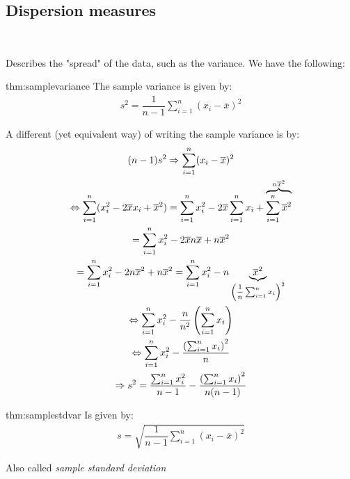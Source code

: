 \subsection{Dispersion measures}\hfill\\\par
\noindent Describes the "spread" of the data, such as the variance. We have the following:
\par\bigskip
\begin{theo}{thm:samplevariance}
  The sample variance is given by:
  \begin{equation*}
    \begin{gathered}
      s^2 = \dfrac{1}{n-1}\sum_{i=1}^{n}(x_i-\overline{x})^2
    \end{gathered}
  \end{equation*}
\end{theo}
\newpage
\noindent A different (yet equivalent way) of writing the sample variance is by:
\begin{equation*}
  \begin{gathered}
    (n-1)s^2\Rightarrow \sum_{i=1}^{n}(x_i-\overline{x})^2\\
    \Leftrightarrow \sum_{i=1}^{n}(x_i^2-2\overline{x}x_i+\overline{x}^2) = \sum_{i=1}^{n}x_i^2-2\overline{x}\sum_{i=1}^{n}x_i+\overbrace{\sum_{i=1}^{n}\overline{x}^2}^{\text{$n\overline{x}^2$}}\\
    =\sum_{i=1}^{n}x_i^2-2\overline{x}n\overline{x}+n\overline{x}^2\\
  =\sum_{i=1}^{n}x_i^2 -2n\overline{x}^2+n\overline{x}^2 = \sum_{i=1}^{n}x_i^2-n\underbrace{\overline{x}^2}_{\text{$\left(\dfrac{1}{n}\sum_{i=1}^{n}x_i\right)^2$}}\\
  \Leftrightarrow \sum_{i=1}^{n}x_i^2-\dfrac{n}{n^2}\left(\sum_{i=1}^{n}x_i\right)\\
  \Leftrightarrow \sum_{i=1}^{n}x_i^2-\dfrac{\left(\sum_{i=1}^{n}x_i\right)^2}{n}\\
  \Rightarrow s^2 = \dfrac{\sum_{i=1}^{n}x_i^2}{n-1}-\dfrac{\left(\sum_{i=1}^{n}x_i\right)^2}{n(n-1)}
  \end{gathered}
\end{equation*}
\par\bigskip
\begin{theo}{thm:samplestdvar}
  Is given by:
  \begin{equation*}
    \begin{gathered}
      s = \sqrt{\dfrac{1}{n-1}\sum_{i=1}^{n}(x_i-\overline{x})^2}
    \end{gathered}
  \end{equation*}
  \par\bigskip
  \noindent Also called \textit{sample standard deviation}
\end{theo}
